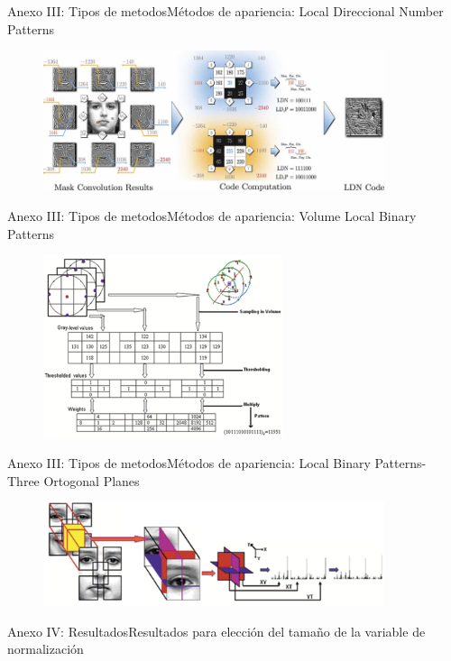 \documentclass{beamer}
\begin{document}
	\begin{frame}{Anexo III: Tipos de metodos}{Métodos de apariencia: Local Direccional Number Patterns}
		\begin{figure}[bt]
			\centering
			\includegraphics[width=10cm]{imagenes/ldn.jpg}
		\end{figure}
	\end{frame}
	
	
	\begin{frame}{Anexo III: Tipos de metodos}{Métodos de apariencia: Volume Local Binary Patterns}
		\begin{figure}[bt]
			\centering
			\includegraphics[width=7cm]{imagenes/vlbp.pdf}
		\end{figure}
	\end{frame}
	
	
	\begin{frame}{Anexo III: Tipos de metodos}{Métodos de apariencia: Local Binary Patterns- Three Ortogonal Planes}
		\begin{figure}[bt]
			\centering
			\includegraphics[width=10cm]{imagenes/lbptop.pdf}
		\end{figure}
	\end{frame}
	
	\begin{frame}{Anexo IV: Resultados}{Resultados para elección del tamaño de la variable de normalización}
		\begin{table}[Bt]
			\centering
			\caption{Tabla comparativa del \textit{Accuracy} obtenido utilizando distintos valores de $N$ y distintos tamaños de las ventanas.}
			\label{tabla:accuracy_N}
		\end{table}
	\end{frame}
	
\end{document}
